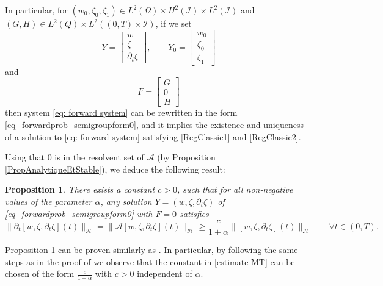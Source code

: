 \documentclass[a4paper, 12pt]{article}
\theoremstyle{plain}
\newtheorem{proposition}[theorem]{Proposition}
\theoremstyle{definition}
\numberwithin{theorem}{section}
\numberwithin{equation}{section}
\begin{document}
In particular, for $(w_0,\zeta_0,\zeta_1) \in L^2(\Omega) \times H^2(\mathcal I) \times L^2(\mathcal I)$ and $(G,H) \in L^2(Q) \times  L^2((0,T) \times \mathcal I)$, if we set
\begin{equation}\label{VarYetY0}
Y=\begin{bmatrix}
w\\
\zeta\\
\partial_t\zeta
\end{bmatrix},\qquad Y_0=\begin{bmatrix}
    w_0\\
    \zeta_0\\
    \zeta_1
\end{bmatrix}
\end{equation}
and 
$$
F=\begin{bmatrix}
G\\
0\\
H
\end{bmatrix}
$$
then system \eqref{eq: forward system} can be rewritten in the form \eqref{eq_forwardprob_semigroupform0}, and it implies the existence and uniqueness of a solution to \eqref{eq: forward system} satisfying \eqref{RegClassic1} and \eqref{RegClassic2}. 


Using that $0$ is in the resolvent set of $\mathcal A$ (by Proposition \ref{PropAnalytiqueEtStable}), we deduce the following result:
\begin{proposition}\label{positivité-de-A}
There exists a constant $c>0$, such that for all non-negative values of the parameter $\alpha$,
any solution $Y = (w,\zeta,\partial_t\zeta)$ of \eqref{eq_forwardprob_semigroupform0} with $F = 0$ satisfies
\begin{equation}\label{estimate-MT}
\|\partial_t[w, \zeta, \partial_t\zeta](t)\|_{\mathscr{H}}=\|\mathcal{A}[w, \zeta, \partial_t\zeta](t)\|_{\mathscr{H}}\geq \frac{c}{1+\alpha}\|[w, \zeta, \partial_t\zeta](t)\|_{\mathscr{H}}\qquad \forall t\in (0,T).
\end{equation} 
\end{proposition}
\noindent Proposition \ref{positivité-de-A} can be proven similarly as \cite[Proposition 3.5]{MT}. In particular, by following the same steps as in the proof of \cite[Proposition 3.5]{MT} we observe that the constant in \eqref{estimate-MT} can be chosen of the form $\frac{c}{1+\alpha}$ with $c>0$ independent of $\alpha$. 
\end{document}
